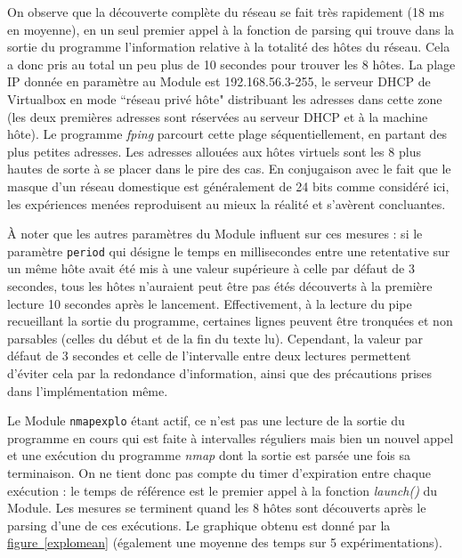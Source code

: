 \documentclass[]{article}
\newcommand{\minit}[1]{\noindent{\small\textbf{ \underline{#1}}}\vspace{0.2cm}}
\newcommand{\wordlink}[2]{\hyperref[#1]{#2~\ref{#1}}}
\begin{document}
On observe que la découverte complète du réseau se fait très rapidement (18 ms en moyenne), en un seul premier appel à la fonction de parsing qui trouve dans la sortie du programme l'information relative à la totalité des hôtes du réseau. Cela a donc pris au total un peu plus de 10 secondes pour trouver les 8 hôtes. La plage IP donnée en paramètre au Module est 192.168.56.3-255, le serveur DHCP de Virtualbox en mode ``réseau privé hôte" distribuant les adresses dans cette zone (les deux premières adresses sont réservées au serveur DHCP et à la machine hôte). Le programme \textit{fping} parcourt cette plage séquentiellement, en partant des plus petites adresses. Les adresses allouées aux hôtes virtuels sont les 8 plus hautes de sorte à se placer dans le pire des cas. En conjugaison avec le fait que le masque d'un réseau domestique est généralement de 24 bits comme considéré ici, les expériences menées reproduisent au mieux la réalité et s'avèrent concluantes.\\ 

 \par À noter que les autres paramètres du Module influent sur ces mesures : si le paramètre \texttt{period} qui désigne le temps en millisecondes entre une retentative sur un même hôte avait été mis à une valeur supérieure à celle par défaut de 3 secondes, tous les hôtes n'auraient peut être pas étés découverts à la première lecture 10 secondes après le lancement. Effectivement, à la lecture du pipe recueillant la sortie du programme, certaines lignes peuvent être tronquées et non parsables (celles du début et de la fin du texte lu). Cependant, la valeur par défaut de 3 secondes et celle de l'intervalle entre deux lectures permettent d'éviter cela par la redondance d'information, ainsi que des précautions prises dans l'implémentation même.\\


\minit{Mesures pour \texttt{nmapexplo}}
\vspace{0.1cm}

\par Le Module \texttt{nmapexplo} étant actif, ce n'est pas une lecture de la sortie du programme en cours qui est faite à intervalles réguliers mais bien un nouvel appel et une exécution du programme \textit{nmap} dont la sortie est parsée une fois sa terminaison. On ne tient donc pas compte du timer d'expiration entre chaque exécution : le temps de référence est le premier appel à la fonction \textit{launch()} du Module. Les mesures se terminent quand les 8 hôtes sont découverts après le parsing d'une de ces exécutions. Le graphique obtenu est donné par la \wordlink{explomean}{figure} (également une moyenne des temps sur 5 expérimentations).\\
\end{document}
